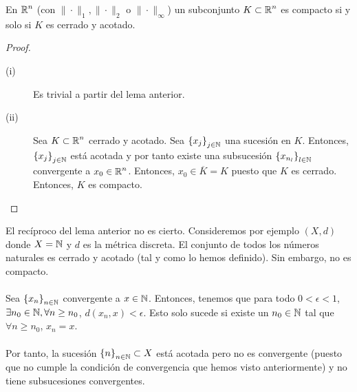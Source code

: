 \begin{theorem}
En $\displaystyle \mathbb{R}^{n} $ (con $\displaystyle \| \cdot \|_{1}, \| \cdot \|_{2} $ o $\displaystyle \| \cdot \|_{\infty} $) un subconjunto $\displaystyle K \subset \mathbb{R}^{n} $ es compacto si y solo si $\displaystyle K $ es cerrado y acotado.
\end{theorem}
\begin{proof}
\begin{description}
	\item[(i)] Es trivial a partir del lema anterior.
	\item[(ii)] Sea $\displaystyle K \subset \mathbb{R}^{n} $ cerrado y acotado. Sea $\displaystyle \left\{ x_{j}\right\} _{j \in \mathbb{N}} $ una sucesión en $\displaystyle K $. Entonces, $\displaystyle \left\{ x_{j}\right\} _{j \in \mathbb{N}} $ está acotada y por tanto existe una subsucesión $\displaystyle \left\{ x_{n_{l}}\right\} _{l \in \mathbb{N}} $ convergente a $\displaystyle x_{0} \in \mathbb{R}^{n} $. 
		Entonces, $\displaystyle x_{0} \in \overline{K} = K $ puesto que $\displaystyle K $ es cerrado. Entonces, $\displaystyle K $ es compacto.
\end{description}
\end{proof}
\begin{eg}
El recíproco del lema anterior no es cierto. Consideremos por ejemplo $\displaystyle \left(X,d\right) $ donde $\displaystyle X = \mathbb{N} $ y $\displaystyle d $ es la métrica discreta. El conjunto de todos los números naturales es cerrado y acotado (tal y como lo hemos definido). Sin embargo, no es compacto. \\ \\
Sea $\displaystyle \left\{ x_{n}\right\} _{n\in\mathbb{N}} $ convergente a $\displaystyle x \in \mathbb{N} $. Entonces, tenemos que para todo $\displaystyle 0 < \epsilon < 1$, $\displaystyle \exists n_{0} \in \mathbb{N}, \forall n \geq n_{0} $, $\displaystyle d\left(x_{n}, x\right) < \epsilon  $. Esto solo sucede si existe un $\displaystyle n_{0} \in \mathbb{N} $ tal que $\displaystyle \forall n\geq n_{0} $, $\displaystyle x_{n} = x $. \\ \\
Por tanto, la sucesión $\displaystyle \left\{ n\right\} _{n\in\mathbb{N}} \subset X$ está acotada pero no es convergente (puesto que no cumple la condición de convergencia que hemos visto anteriormente) y no tiene subsucesiones convergentes. 
\end{eg}
